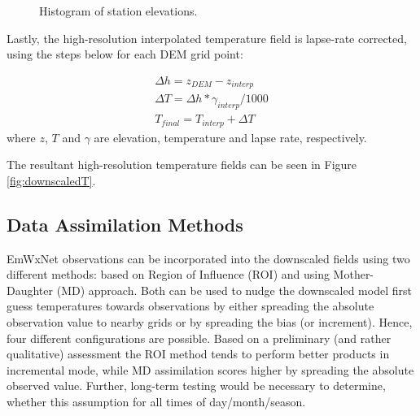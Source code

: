\documentclass{article}
\begin{document}
\begin{figure}
\caption{Histogram of station elevations.}\label{fig:histogram} 
\end{figure}

Lastly, the high-resolution interpolated temperature field is lapse-rate corrected, using the steps below for each DEM grid point:

\begin{eqnarray}
\Delta h = z_{DEM} - z_{interp} \nonumber \\
\Delta T = \Delta h * \gamma_{interp}/1000  \nonumber\\
T_{final} = T_{interp} + \Delta T
\end{eqnarray}
where $z$, $T$ and $\gamma$ are elevation, temperature and lapse rate, respectively. 

The resultant high-resolution temperature fields can be seen in Figure \ref{fig:downscaledT}. 
\FloatBarrier

\subsection{Data Assimilation Methods}
EmWxNet observations can be incorporated into the downscaled fields using two different methods: based on Region of Influence (ROI) and using Mother-Daughter (MD) approach. Both can be used to nudge the downscaled model first guess temperatures towards observations by either spreading the absolute observation value to nearby grids or by spreading the bias (or increment). Hence, four different configurations are possible. Based on a preliminary (and rather qualitative) assessment the ROI method tends to perform better products in incremental mode, while MD assimilation scores higher by spreading the absolute observed value. Further, long-term testing would be necessary to determine, whether this assumption for all times of day/month/season. 
\end{document}

